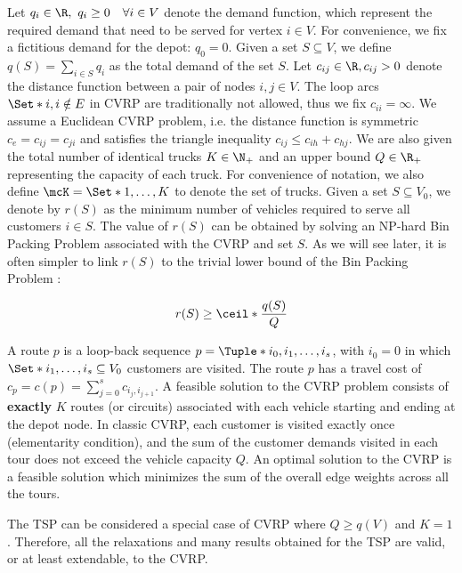 Let $q_{i} \in \R,\ q_{i} \ge 0 \quad \forall i \in V$ denote the demand function, which represent the required demand that need to be served for vertex $i \in V$.
For convenience, we fix a fictitious demand for the depot: $q_0 = 0$.
Given a set $S \subseteq V$, we define $q(S) = \sum_{i \in S} q_i$ as the total demand of the set $S$.
Let $c_{ij} \in \R, c_{ij} > 0$ denote the distance function between a pair of nodes  $i, j \in V$.
The loop arcs $\Set*{i, i} \notin E$ in CVRP are traditionally not allowed, thus we fix $c_{ii} = \infty$.
We assume a Euclidean CVRP problem, i.e. the distance function is symmetric $c_e = c_{ij} = c_{ji}$ and satisfies the triangle inequality $c_{ij} \le c_{ih} + c_{hj}$.
We are also given the total number of identical trucks $K \in \N_+$ and an upper bound $Q \in \R_+$ representing the capacity of each truck.
For convenience of notation, we also define $\mcK = \Set*{1, \dots, K}$ to denote the set of trucks.
Given a set $S \subseteq V_0$, we denote by $r(S)$ as the minimum number of vehicles required to serve all customers $i \in S$.
The value of $r(S)$ can be obtained by solving an NP-hard Bin Packing Problem associated with the CVRP and set $S$.
As we will see later, it is often simpler to link $r(S)$ to the trivial lower bound of the Bin Packing Problem \parencite{martello1990}:

\begin{equation}
	r(S) \ge \ceil*{\frac{q(S)}{Q}}
\end{equation}

A route $p$ is a loop-back sequence $p = \Tuple*{i_0, i_1, \dots, i_s}$, with $i_0 = 0$ in which
$\Set*{i_1, \dots, i_s} \subseteq V_0$ customers are visited.
The route $p$ has a travel cost of $c_p = c(p) = \sum_{j=0}^s c_{i_j,i_{j+1}}$.
A feasible solution to the CVRP problem consists of \textbf{exactly} $K$ routes (or circuits)
associated with each vehicle starting and ending at the depot node.
In classic CVRP, each customer is visited exactly once (elementarity condition),
and the sum of the customer demands visited in each tour does not exceed the vehicle capacity $Q$.
An optimal solution to the CVRP is a feasible solution which minimizes the sum of the overall edge weights across all the tours.

\medskip

The TSP can be considered a special case of CVRP where $Q \ge q(V)$ and $K = 1$.
Therefore, all the relaxations and many results obtained for the TSP are valid, or at least extendable, to the CVRP.

